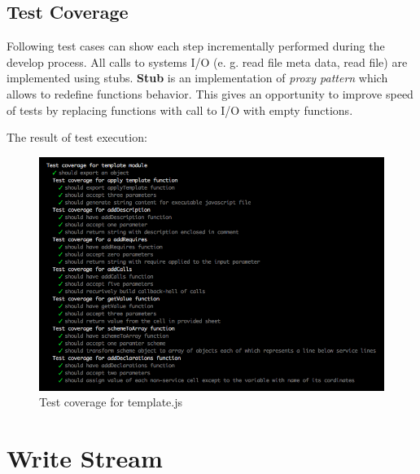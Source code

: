 \subsection{Test Coverage}
Following test cases can show each step incrementally performed during the develop process. All calls to systems I/O (e. g. read file meta data, read file) are implemented using stubs. \textbf{Stub} is an implementation of \textit{proxy pattern} which allows to redefine functions behavior. This gives an opportunity to improve speed of tests by replacing functions with call to I/O with empty functions.

%

The result of test execution:
\begin{figure}[H]
	\centering
	\includegraphics[width=\linewidth]{grafiken/testTemplate.png}
	\caption{Test coverage for template.js}
	\label{fig:testTemplate}
\end{figure}


\section{Write Stream}

